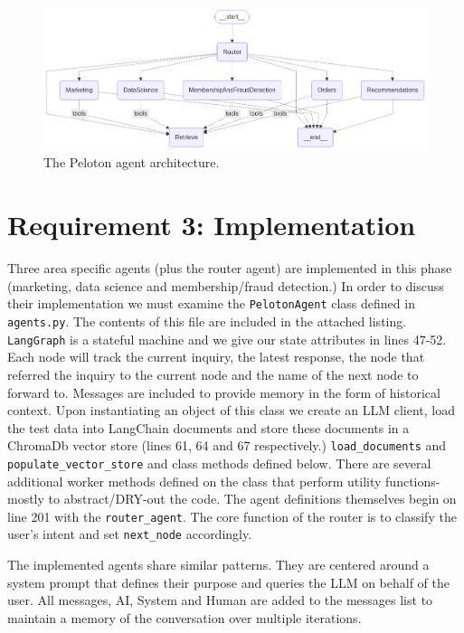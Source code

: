 \documentclass[11pt,letterpaper]{article}
\begin{document}
\begin{figure}[h]
    \centering
      \includegraphics[width=1.0\linewidth]{graph.png}
      \caption{The Peloton agent architecture.}
    \label{fig:graph}
\end{figure}

\section*{Requirement 3: Implementation}
\tab Three area specific agents (plus the router agent) are implemented in this phase (marketing, data science and membership/fraud detection.)
In order to discuss their implementation we must examine the \texttt{PelotonAgent} class defined in \texttt{agents.py}. The contents of this file are included in the attached listing. \texttt{LangGraph} is a stateful machine and we give our state attributes in lines 47-52. Each node will track the current inquiry, the latest response, the node that referred the inquiry to the current node and the name of the next node to forward to. Messages are included to provide memory in the form of historical context. Upon instantiating an object of this class we create an LLM client, load the test data into LangChain documents and store these documents in a ChromaDb vector store (lines 61, 64 and 67 respectively.)
\texttt{load\_documents} and \texttt{populate\_vector\_store} and class methods defined below. There are several additional worker methods defined on the class that perform utility functions- mostly to abstract/DRY-out the code. The agent definitions themselves begin on line 201 with the \texttt{router\_agent}. The core function of the router is to classify the user's intent and set \texttt{next\_node} accordingly. 

The implemented agents share similar patterns. They are centered around a system prompt that defines their purpose and queries the LLM on behalf of the user. All messages, AI, System and Human are added to the messages list to maintain a memory of the conversation over multiple iterations.
\end{document}
